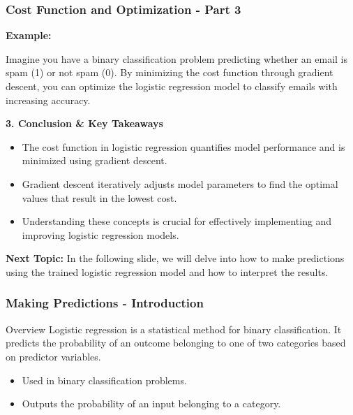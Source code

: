 \documentclass[aspectratio=169]{beamer}
\begin{document}
\begin{frame}[fragile]
    \frametitle{Cost Function and Optimization - Part 3}

    \textbf{Example:}
    
    Imagine you have a binary classification problem predicting whether an email is spam (1) or not spam (0). 
    By minimizing the cost function through gradient descent, you can optimize the logistic regression model to classify emails with increasing accuracy.

    \textbf{3. Conclusion \& Key Takeaways}
    \begin{itemize}
        \item The cost function in logistic regression quantifies model performance and is minimized using gradient descent.
        \item Gradient descent iteratively adjusts model parameters to find the optimal values that result in the lowest cost.
        \item Understanding these concepts is crucial for effectively implementing and improving logistic regression models.
    \end{itemize}
    
    \textbf{Next Topic:} In the following slide, we will delve into how to make predictions using the trained logistic regression model and how to interpret the results.
\end{frame}

\begin{frame}[fragile]
  \frametitle{Making Predictions - Introduction}
  
  \begin{block}{Overview}
    Logistic regression is a statistical method for binary classification. It predicts the probability of an outcome belonging to one of two categories based on predictor variables.
  \end{block}
  
  \begin{itemize}
    \item Used in binary classification problems.
    \item Outputs the probability of an input belonging to a category.
  \end{itemize}
  
\end{frame}
\end{document}
